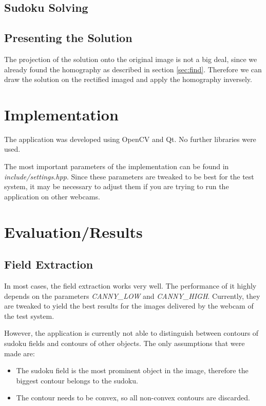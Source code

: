 \documentclass[
a4paper,     %
12pt         %
]{scrartcl}  %
\begin{document}
\subsection{Sudoku Solving}

\subsection{Presenting the Solution}

The projection of the solution onto the original image is not a big deal, since we already
found the homography as described in section \ref{sec:find}. Therefore we can draw the solution
on the rectified imaged and apply the homography inversely.

\section{Implementation}

The application was developed using OpenCV and Qt. No further libraries were used.

The most important parameters of the implementation can be found in \emph{include/settings.hpp}.
Since these parameters are tweaked to be best for the test system, it may be necessary to
adjust them if you are trying to run the application on other webcams. 

\section{Evaluation/Results}
\label{sec:results}

\subsection{Field Extraction}

In most cases, the field extraction works very well. The performance of it highly depends on the 
parameters \emph{CANNY\_LOW} and \emph{CANNY\_HIGH}. Currently, they are tweaked to yield the best
results for the images delivered by the webcam of the test system.

However, the application is currently not able to distinguish between contours of sudoku fields and
contours of other objects. The only assumptions that were made are:

\begin{itemize}
  \item The sudoku field is the most prominent object in the image, therefore the biggest contour
  belongs to the sudoku.
  \item The contour needs to be convex, so all non-convex contours are discarded.
\end{itemize}
\end{document}

